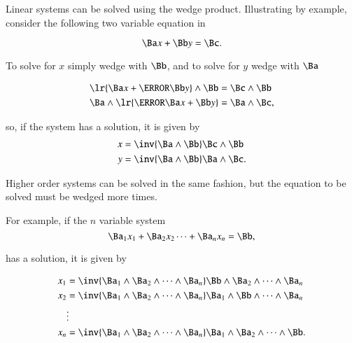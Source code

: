 %
%
Linear systems can be solved using the wedge product.  Illustrating by example, consider the following two variable equation in 

\begin{dmath}\label{eqn:solutionOfLinearSystem:1160}
\Ba x + \Bb y = \Bc.
\end{dmath}

To solve for \( x \) simply wedge with \( \Bb \), and to solve for \( y \) wedge with \( \Ba \)

\begin{dmath}\label{eqn:solutionOfLinearSystem:1180}
\begin{aligned}
\lr{ \Ba x + \cancel{\Bb} y } \wedge \Bb &= \Bc \wedge \Bb \\
\Ba \wedge \lr{ \cancel{\Ba} x + \Bb y } &= \Ba \wedge \Bc,
\end{aligned}
\end{dmath}

so, if the system has a solution, it is given by
\begin{dmath}\label{eqn:solutionOfLinearSystem:1200}
\begin{aligned}
x &= \inv{ \Ba \wedge \Bb } \Bc \wedge \Bb \\
y &= \inv{ \Ba \wedge \Bb } \Ba \wedge \Bc.
\end{aligned}
\end{dmath}

Higher order systems can be solved in the same fashion, but the equation to be solved must be wedged more times.

For example, if the \( n \) variable system
\begin{dmath}\label{eqn:solutionOfLinearSystem:1220}
\Ba_1 x_1 + \Ba_2 x_2 \cdots + \Ba_n x_n = \Bb,
\end{dmath}

has a solution, it is given by

\begin{dmath}\label{eqn:solutionOfLinearSystem:1240}
\begin{aligned}
x_1 &= \inv{ \Ba_1 \wedge \Ba_2 \wedge \cdots \wedge \Ba_n } \Bb \wedge \Ba_2 \wedge \cdots \wedge \Ba_n  \\
x_2 &= \inv{ \Ba_1 \wedge \Ba_2 \wedge \cdots \wedge \Ba_n } \Ba_1 \wedge \Bb \wedge \cdots \wedge \Ba_n  \\
    & \vdots \\
x_n &= \inv{ \Ba_1 \wedge \Ba_2 \wedge \cdots \wedge \Ba_n } \Ba_1 \wedge \Ba_2 \wedge \cdots \wedge \Bb.
\end{aligned}
\end{dmath}

